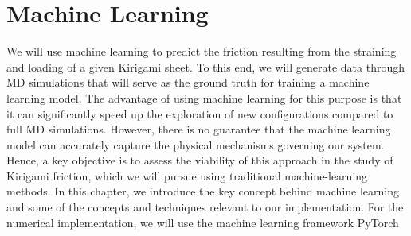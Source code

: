 \chapter{Machine Learning}\label{chap:ML}
We will use machine learning to predict the friction resulting from the straining and loading of a given Kirigami sheet. To this end, we will generate data through \acrshort{MD} simulations that will serve as the ground truth for training a machine learning model. The advantage of using machine learning for this purpose is that it can significantly speed up the exploration of new configurations compared to full \acrshort{MD} simulations. However, there is no guarantee that the machine learning model can accurately capture the physical mechanisms governing our system. Hence, a key objective is to assess
the viability of this approach in the study of Kirigami friction, which we will pursue using traditional machine-learning methods. In this
chapter, we introduce the key concept behind machine learning and some of the concepts and techniques relevant to our implementation. For the numerical implementation, we will use the machine learning framework PyTorch~\cite{NEURIPS2019_9015}


